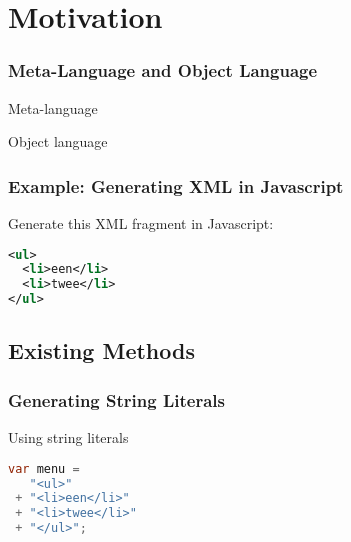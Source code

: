 \documentclass{beamer}
\begin{document}
\section{Motivation}



\begin{frame}

  \frametitle{Meta-Language and Object Language}

  \begin{block}{Meta-language}
  \end{block}

  \begin{block}{Object language}
  \end{block}

\end{frame}


\begin{frame}[fragile]

  \frametitle{Example: Generating XML in Javascript}

  Generate this XML fragment in Javascript:

  \begin{lstlisting}[language=XML]
<ul>
  <li>een</li>
  <li>twee</li>
</ul>
  \end{lstlisting}

\end{frame}


\subsection{Existing Methods}

\begin{frame}[fragile]

  \frametitle{Generating String Literals}

  \begin{block}{Using string literals}
    \begin{lstlisting}[language=Java]
var menu =
   "<ul>"
 + "<li>een</li>"
 + "<li>twee</li>"
 + "</ul>";
    \end{lstlisting}
  \end{block}

\end{frame}
\end{document}
